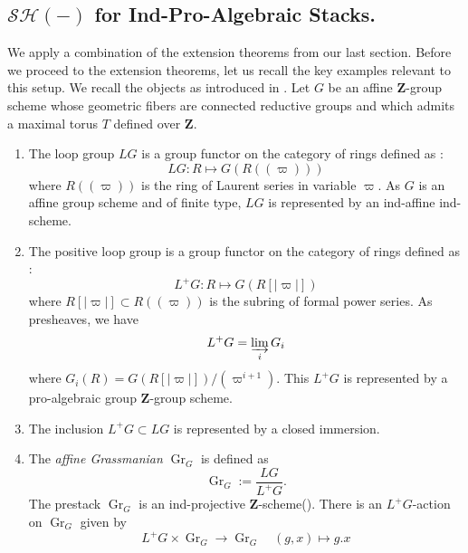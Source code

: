 \documentclass[14pt]{article}
\theoremstyle{definition}
\newcommand{\op}[1]{\operatorname{#1}}
\numberwithin{subsection}{section}
\newcommand{\SH}{\mathcal{SH}}
\begin{document}
\subsection{$\SH(-)$ for Ind-Pro-Algebraic Stacks.}

We apply a combination of the extension theorems from our last section. Before we proceed to the extension theorems, let us recall the key examples relevant to this setup. We recall the objects as introduced in \cite[Section 4]{richarzscholbachintersectionmotive}.
Let $G$ be an affine $\mathbf{Z}$-group scheme whose geometric fibers are connected reductive groups and which admits a maximal torus $T$ defined over $\mathbf{Z}$.
\begin{enumerate}
    \item The loop group $LG$ is a group functor on the category of rings defined as :
    \begin{equation}
        LG : R \mapsto G(R((\varpi)))
    \end{equation}
    where $R((\varpi))$ is the ring of Laurent series in variable $\varpi$.
    As $G$ is an affine group scheme and of finite type, $LG$ is represented by an ind-affine ind-scheme.
    \item The positive loop group is a group functor on the category of rings defined as :
    \begin{equation}
        L^+G : R \mapsto G(R[|\varpi|])
    \end{equation}
    where $R[|\varpi|] \subset R((\varpi))$ is the subring of formal power series. As presheaves, we have 
    \begin{equation}
    L^+G = \varinjlim_i G_i
    \end{equation}
    where $G_i(R) = G(R[|\varpi|])/(\varpi^{i+1})$. This $L^+G$ is represented by a pro-algebraic group $\mathbf{Z}$-group scheme. 
    \item The inclusion $L^+G \subset LG$ is represented by a closed immersion. 
    \item The \textit{affine Grassmanian} $\op{Gr}_G$ is defined as 
    \begin{equation}
        \op{Gr}_G := \frac{LG}{L^+G}.
    \end{equation} 
    The prestack $\op{Gr}_G$ is an ind-projective $\mathbf{Z}$-scheme(\cite[Section 4.3]{richarzscholbachintersectionmotive}). There is an $L^+G$-action on $\op{Gr}_G$ given by 
    \begin{equation}
        L^+G \times \op{Gr}_G \to \op{Gr}_G \quad (g,x) \mapsto g.x
    \end{equation}

\end{enumerate}
\end{document}

